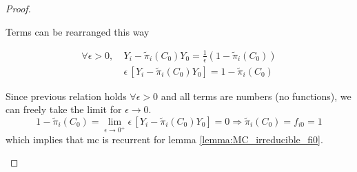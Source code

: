 \begin{proof}
\begin{enumerate}
		Terms can be rearranged this way

		\begin{equation*}\begin{split}
			\forall \epsilon > 0, ~ & Y_i - \tilde{\pi}_i(C_0) Y_0 = \frac{1}{\epsilon} \left( 1 - \tilde{\pi}_i(C_0) \right) \\
			& \epsilon \, [Y_i - \tilde{\pi}_i(C_0) Y_0] = 1 - \tilde{\pi}_i(C_0)
		\end{split}\end{equation*}

		Since previous relation holds $\forall \epsilon > 0$ and all terms are numbers (no functions), we can freely take the limit for $\epsilon \to 0$.
		$$ 1 - \tilde{\pi}_i(C_0) = \lim_{\epsilon \to 0^{+}} \epsilon \, [Y_i - \tilde{\pi}_i(C_0) Y_0] = 0 \Rightarrow \tilde{\pi}_i(C_0) = f_{i0} = 1$$
		which implies that \gls{mc} is recurrent for lemma \ref{lemma:MC_irreducible_fi0}.
		\end{enumerate}
	\end{proof}
